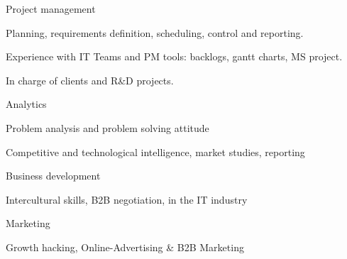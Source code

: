 


\begin{cventries}
	
	\zcventry
	{Project management} %
	{
		\begin{cvitems} %
			\item {Planning, requirements definition, scheduling, control and reporting.}
			\item {Experience with IT Teams and PM tools: backlogs, gantt charts, MS project.}
			\item {In charge of clients and R\&D projects.}
		\end{cvitems}
	}
	
	\zcventry
	{Analytics} %
	{
		\begin{cvitems} %
			\item {Problem analysis and problem solving attitude}
			\item {Competitive and technological intelligence, market studies, reporting}
		\end{cvitems}
	}
	
	\zcventry
	{Business development} %
	{
		\begin{cvitems} %
			\item {Intercultural skills, B2B negotiation, in the IT industry}
		\end{cvitems}
	}
	
	\zcventry
	{Marketing} %
	{
		\begin{cvitems} %
			\item {Growth hacking, Online-Advertising \& B2B Marketing}
		\end{cvitems}
	}
	
\end{cventries}


